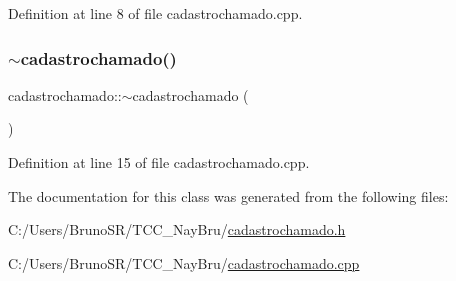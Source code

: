 Definition at line 8 of file cadastrochamado.\+cpp.

\hypertarget{classcadastrochamado_aafb8985f35d1e6d47dbc8be3a4cf0de9}{}\label{classcadastrochamado_aafb8985f35d1e6d47dbc8be3a4cf0de9} 
\subsubsection{\texorpdfstring{$\sim$cadastrochamado()}{~cadastrochamado()}}
{\footnotesize\ttfamily cadastrochamado\+::$\sim$cadastrochamado (\begin{DoxyParamCaption}{ }\end{DoxyParamCaption})}



Definition at line 15 of file cadastrochamado.\+cpp.



The documentation for this class was generated from the following files\+:\begin{DoxyCompactItemize}
\item 
C\+:/\+Users/\+Bruno\+S\+R/\+T\+C\+C\+\_\+\+Nay\+Bru/\hyperlink{cadastrochamado_8h}{cadastrochamado.\+h}\item 
C\+:/\+Users/\+Bruno\+S\+R/\+T\+C\+C\+\_\+\+Nay\+Bru/\hyperlink{cadastrochamado_8cpp}{cadastrochamado.\+cpp}\end{DoxyCompactItemize}
